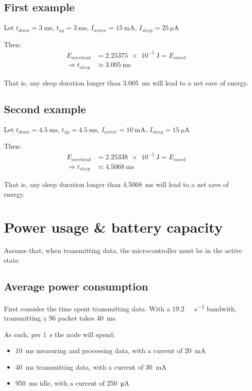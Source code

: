 \documentclass[a4paper]{scrreprt}
\begin{document}
\subsection{First example}

Let $t_{down} = \SI{3}{\ms}$, $t_{up} = \SI{3}{\ms}$, $I_{active} = \SI{15}{\mA}$, $I_{sleep} = \SI{25}{\uA}$

Then:
\begin{align*}
		E_{overhead} & = \SI{2.25375e-5}{\J} = E_{saved} \\
		\Rightarrow t_{sleep} & \approx \SI{3.005}{\ms}
\end{align*}

That is, any sleep duration longer than \SI{3.005}{\ms} will lead to a net
save of energy.

\subsection{Second example}

Let $t_{down} = \SI{4.5}{\ms}$, $t_{up} = \SI{4.5}{\ms}$, $I_{active} = \SI{10}{\mA}$, $I_{sleep} = \SI{15}{\uA}$

Then:
\begin{align*}
		E_{overhead} & = \SI{2.25338e-5}{\J} = E_{saved} \\
		\Rightarrow t_{sleep} & \approx \SI{4.5068}{\ms}
\end{align*}

That is, any sleep duration longer than \SI{4.5068}{\ms} will lead to a net
save of energy.

\section{Power usage \& battery capacity}

Assume that, when transmitting data, the microcontroller must be in the active
state.

\subsection{Average power consumption}

First consider the time spent transmitting data. With a
\SI{19.2}{\kilo\bit\per\second} bandwith, transmitting a \SI{96}{\byte} packet
takes \SI{40}{\ms}.

As such, per \SI{1}{\s} the node will spend:

\begin{itemize}
		\item \SI{10}{\ms} measuring and processing data, with a current of \SI{20}{\mA}
		\item \SI{40}{\ms} transmitting data, with a current of \SI{30}{\mA}
		\item \SI{950}{\ms} idle, with a current of \SI{250}{\uA}
\end{itemize}
\end{document}
